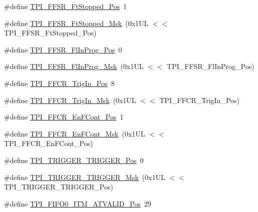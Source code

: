 \begin{DoxyCompactItemize}
\item 
\#define \mbox{\hyperlink{group___c_m_s_i_s___t_p_i_gaedf31fd453a878021b542b644e2869d2}{T\+P\+I\+\_\+\+F\+F\+S\+R\+\_\+\+Ft\+Stopped\+\_\+\+Pos}}~1
\item 
\#define \mbox{\hyperlink{group___c_m_s_i_s___t_p_i_ga1ab6c3abe1cf6311ee07e7c479ce5f78}{T\+P\+I\+\_\+\+F\+F\+S\+R\+\_\+\+Ft\+Stopped\+\_\+\+Msk}}~(0x1\+U\+L $<$$<$ T\+P\+I\+\_\+\+F\+F\+S\+R\+\_\+\+Ft\+Stopped\+\_\+\+Pos)
\item 
\#define \mbox{\hyperlink{group___c_m_s_i_s___t_p_i_ga542ca74a081588273e6d5275ba5da6bf}{T\+P\+I\+\_\+\+F\+F\+S\+R\+\_\+\+Fl\+In\+Prog\+\_\+\+Pos}}~0
\item 
\#define \mbox{\hyperlink{group___c_m_s_i_s___t_p_i_ga63dfb09259893958962914fc3a9e3824}{T\+P\+I\+\_\+\+F\+F\+S\+R\+\_\+\+Fl\+In\+Prog\+\_\+\+Msk}}~(0x1\+U\+L $<$$<$ T\+P\+I\+\_\+\+F\+F\+S\+R\+\_\+\+Fl\+In\+Prog\+\_\+\+Pos)
\item 
\#define \mbox{\hyperlink{group___c_m_s_i_s___t_p_i_gaa7ea11ba6ea75b541cd82e185c725b5b}{T\+P\+I\+\_\+\+F\+F\+C\+R\+\_\+\+Trig\+In\+\_\+\+Pos}}~8
\item 
\#define \mbox{\hyperlink{group___c_m_s_i_s___t_p_i_ga360b413bc5da61f751546a7133c3e4dd}{T\+P\+I\+\_\+\+F\+F\+C\+R\+\_\+\+Trig\+In\+\_\+\+Msk}}~(0x1\+U\+L $<$$<$ T\+P\+I\+\_\+\+F\+F\+C\+R\+\_\+\+Trig\+In\+\_\+\+Pos)
\item 
\#define \mbox{\hyperlink{group___c_m_s_i_s___t_p_i_ga99e58a0960b275a773b245e2b69b9a64}{T\+P\+I\+\_\+\+F\+F\+C\+R\+\_\+\+En\+F\+Cont\+\_\+\+Pos}}~1
\item 
\#define \mbox{\hyperlink{group___c_m_s_i_s___t_p_i_ga27d1ecf2e0ff496df03457a2a97cb2c9}{T\+P\+I\+\_\+\+F\+F\+C\+R\+\_\+\+En\+F\+Cont\+\_\+\+Msk}}~(0x1\+U\+L $<$$<$ T\+P\+I\+\_\+\+F\+F\+C\+R\+\_\+\+En\+F\+Cont\+\_\+\+Pos)
\item 
\#define \mbox{\hyperlink{group___c_m_s_i_s___t_p_i_ga5517fa2ced64efbbd413720329c50b99}{T\+P\+I\+\_\+\+T\+R\+I\+G\+G\+E\+R\+\_\+\+T\+R\+I\+G\+G\+E\+R\+\_\+\+Pos}}~0
\item 
\#define \mbox{\hyperlink{group___c_m_s_i_s___t_p_i_ga814227af2b2665a0687bb49345e21110}{T\+P\+I\+\_\+\+T\+R\+I\+G\+G\+E\+R\+\_\+\+T\+R\+I\+G\+G\+E\+R\+\_\+\+Msk}}~(0x1\+U\+L $<$$<$ T\+P\+I\+\_\+\+T\+R\+I\+G\+G\+E\+R\+\_\+\+T\+R\+I\+G\+G\+E\+R\+\_\+\+Pos)
\item 
\#define \mbox{\hyperlink{group___c_m_s_i_s___t_p_i_gaa7e050e9eb6528241ebc6835783b6bae}{T\+P\+I\+\_\+\+F\+I\+F\+O0\+\_\+\+I\+T\+M\+\_\+\+A\+T\+V\+A\+L\+I\+D\+\_\+\+Pos}}~29
\item 
$$
\end{DoxyCompactItemize}
